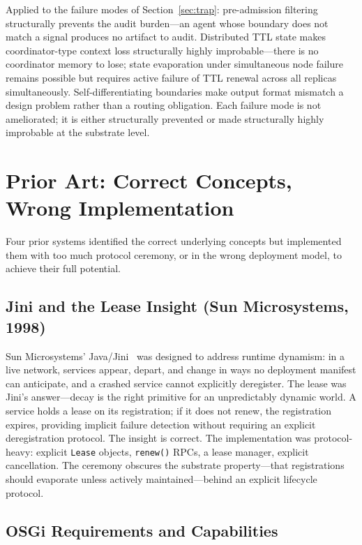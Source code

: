 \documentclass[11pt]{article}
\begin{document}
Applied to the failure modes of Section~\ref{sec:trap}: pre-admission filtering
structurally prevents the audit burden---an agent whose boundary does not match a
signal produces no artifact to audit. Distributed TTL state makes
coordinator-type context loss structurally highly improbable---there is no
coordinator memory to lose; state evaporation under simultaneous node failure
remains possible but requires active failure of TTL renewal across all replicas
simultaneously. Self-differentiating boundaries make output format mismatch a
design problem rather than a routing obligation. Each failure mode is not
ameliorated; it is either structurally prevented or made structurally highly
improbable at the substrate level.

\section{Prior Art: Correct Concepts, Wrong Implementation}

Four prior systems identified the correct underlying concepts but implemented them
with too much protocol ceremony, or in the wrong deployment model, to achieve
their full potential.

\subsection{Jini and the Lease Insight (Sun Microsystems, 1998)}

Sun Microsystems' Java/Jini~\cite{jini-arch,jini-spec} was designed to address
runtime dynamism: in a live network, services appear, depart, and change in ways
no deployment manifest can anticipate, and a crashed service cannot explicitly
deregister. The lease was Jini's answer---decay is the right primitive for an
unpredictably dynamic world. A service holds a lease on its registration; if it
does not renew, the registration expires, providing implicit failure detection
without requiring an explicit deregistration protocol. The insight is correct.
The implementation was protocol-heavy: explicit \texttt{Lease} objects,
\texttt{renew()} RPCs, a lease manager, explicit cancellation. The ceremony
obscures the substrate property---that registrations should evaporate unless
actively maintained---behind an explicit lifecycle protocol.

\subsection{OSGi Requirements and Capabilities}
\end{document}
